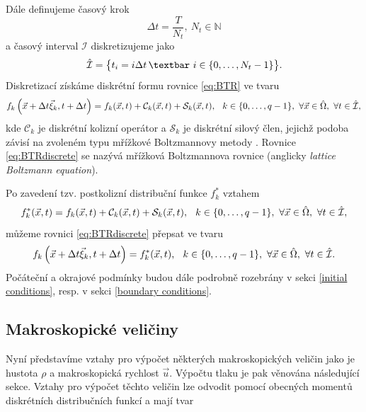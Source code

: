 Dále definujeme časový krok
\begin{equation}\label{eq:timestep}
\Delta t = \frac{T}{N_{t}}, \ N_{t} \in \mathbb{N}
\end{equation}
a časový interval $ \mathcal{I} $ diskretizujeme jako
\begin{equation}\label{eq:timediscrete}
\hat{\mathcal{I}} = \big\{ t_{i} = i \Delta t \, \textbar \ i \in \{0, \dots, N_{t} - 1\} \big\}.
\end{equation}
Diskretizací získáme diskrétní formu rovnice \eqref{eq:BTR} ve tvaru
\begin{equation}\label{eq:BTRdiscrete}
f_{k}\left(\vec{x}+\Delta t \vec{\xi}_{k}, t+\Delta t \right) =
f_{k}(\vec{x}, t) + \mathcal{C}_{k}(\vec{x}, t) + \mathcal{S}_{k}(\vec{x}, t), \hspace{2.5mm} k \in \{0, \dots, q-1 \}, \ \forall \vec{x} \in \hat{\Omega}, \ \forall t \in \hat{\mathcal{I}},
\end{equation}
kde $ \mathcal{C}_{k} $ je diskrétní kolizní operátor a $ \mathcal{S}_{k} $ je diskrétní silový člen, jejichž podoba závisí na zvoleném typu mřížkové Boltzmannovy metody \cite{Kruger}. Rovnice \eqref{eq:BTRdiscrete} se nazývá mřížková Boltzmannova rovnice (anglicky \textit{lattice Boltzmann equation}).

Po zavedení tzv. postkolizní distribuční funkce $ f^{*}_{k} $ vztahem
\begin{equation}\label{eq:fstar}
f^{*}_{k}(\vec{x}, t) = f_{k}(\vec{x}, t) + \mathcal{C}_{k}(\vec{x}, t) + \mathcal{S}_{k}(\vec{x}, t), \hspace{2.5mm} k \in \{0, \dots, q-1 \}, \ \forall \vec{x} \in \hat{\Omega}, \ \forall t \in \hat{\mathcal{I}},
\end{equation}
můžeme rovnici \eqref{eq:BTRdiscrete} přepsat ve tvaru
\begin{equation}\label{eq:collision}
f_{k}\left(\vec{x}+\Delta t \vec{\xi}_{k}, t+\Delta t\right) = f^{*}_{k}(\vec{x}, t), \hspace{2.5mm} k \in \{0, \dots, q-1 \}, \ \forall \vec{x} \in \hat{\Omega}, \ \forall t \in \hat{\mathcal{I}}.
\end{equation}
Počáteční a okrajové podmínky budou dále podrobně rozebrány v sekci \ref{initial conditions}, resp. v sekci \ref{boundary conditions}.
\subsection{Makroskopické veličiny}\label{macro}
Nyní představíme vztahy pro výpočet některých makroskopických veličin jako je hustota $ \rho $ a makroskopická rychlost $ \vec{u} $. Výpočtu tlaku je pak věnována následující sekce. Vztahy pro výpočet těchto veličin lze odvodit pomocí obecných momentů diskrétních distribučních funkcí a mají tvar

